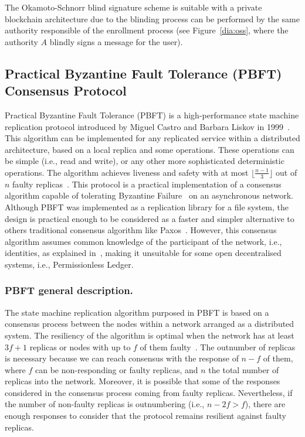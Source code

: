 \documentclass[conference]{IEEEtran}
\begin{document}
The Okamoto-Schnorr blind signature scheme is suitable with a private blockchain architecture due to the blinding process can be performed by the same authority responsible of the enrollment process (see Figure~\ref{dia:oss}, where the authority $A$ blindly signs a message for the user).

\subsection{Practical Byzantine Fault Tolerance (PBFT) Consensus Protocol}
\label{PBFT}
Practical Byzantine Fault Tolerance (PBFT) is a high-performance state machine replication protocol introduced by Miguel Castro and Barbara Liskov in 1999~\cite{castro1999practical}. This algorithm can be implemented for any replicated service within a distributed architecture, based on a local replica and some operations. These operations can be simple (i.e., read and write), or any other more sophisticated deterministic operations. The algorithm achieves liveness and safety with at most $\lfloor \frac{n-1}{3} \rfloor$ out of $n$ faulty replicas~\cite{castro1999practical}. This protocol is a practical implementation of a consensus algorithm capable of tolerating Byzantine Failure~\cite{lamport1982byzantine} on an asynchronous network. Although PBFT was implemented as a replication library for a file system, the design is practical enough to be considered as a faster and simpler alternative to others traditional consensus algorithm like Paxos~\cite{martin2006fast}. However, this consensus algorithm assumes common knowledge of the participant of the network, i.e., identities, as explained in~\cite{pass2017analysis}, making it unsuitable for some open decentralised systems, i.e., Permissionless Ledger.

\subsubsection{PBFT general description.}
The state machine replication algorithm purposed in PBFT is based on a consensus process between the nodes within a network arranged as a distributed system. The resiliency of the algorithm is optimal when the network has at least $3f+1$ replicas or nodes with up to $f$ of them faulty~\cite{bracha1985asynchronous}. The outnumber of replicas is necessary because we can reach consensus with the response of $n-f$ of them, where $f$ can be non-responding or faulty replicas, and $n$ the total number of replicas into the network. Moreover, it is possible that some of the responses considered in the consensus process coming from faulty replicas. Nevertheless, if the number of non-faulty replicas is outnumbering (i.e., $n-2f > f$), there are enough responses to consider that the protocol remains resilient against faulty replicas.
\end{document}
